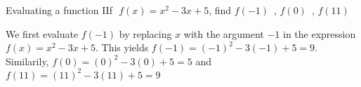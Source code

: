 \begin{example}{Evaluating a function}
	IIf $\,\,\displaystyle{f(x)=x^{2}-3x+5}$, \hspace{2mm} find  $\displaystyle{f(-1)} \,$ , \hspace{2mm}  $\displaystyle{f(0)} \, $ , \hspace{2mm}  $\displaystyle{f(11)}$
\end{example}
\begin{solution}
	We first evaluate $f(-1)$ by replacing $x$ with the argument $-1$ in the expression \\ $\displaystyle{f(x)=x^{2}-3x+5}$. This yields \hspace{2mm} $\displaystyle{f(-1)=(-1)^{2}-3(-1)+5= 9}$. \\
	
	Similarily,   \hspace{2mm} $\displaystyle{f(0)=(0)^{2}-3(0)+5= 5}$ \hspace{2mm} and  \hspace{2mm}  $\displaystyle{f(11)=(11)^{2}-3(11)+5= 9}$ \\
\end{solution}

